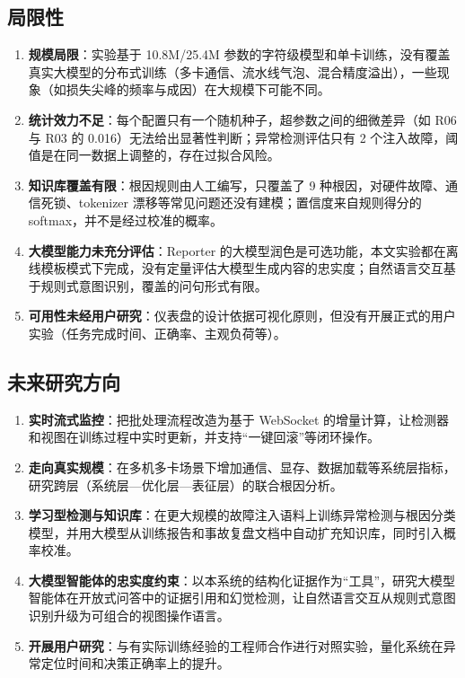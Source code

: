 \subsection{局限性}

\begin{enumerate}
\item \textbf{规模局限}：实验基于 10.8M/25.4M 参数的字符级模型和单卡训练，没有覆盖真实大模型的分布式训练（多卡通信、流水线气泡、混合精度溢出），一些现象（如损失尖峰的频率与成因）在大规模下可能不同。
\item \textbf{统计效力不足}：每个配置只有一个随机种子，超参数之间的细微差异（如 R06 与 R03 的 0.016）无法给出显著性判断；异常检测评估只有 2 个注入故障，阈值是在同一数据上调整的，存在过拟合风险。
\item \textbf{知识库覆盖有限}：根因规则由人工编写，只覆盖了 9 种根因，对硬件故障、通信死锁、tokenizer 漂移等常见问题还没有建模；置信度来自规则得分的 softmax，并不是经过校准的概率。
\item \textbf{大模型能力未充分评估}：Reporter 的大模型润色是可选功能，本文实验都在离线模板模式下完成，没有定量评估大模型生成内容的忠实度；自然语言交互基于规则式意图识别，覆盖的问句形式有限。
\item \textbf{可用性未经用户研究}：仪表盘的设计依据可视化原则，但没有开展正式的用户实验（任务完成时间、正确率、主观负荷等）。
\end{enumerate}

\subsection{未来研究方向}

\begin{enumerate}
\item \textbf{实时流式监控}：把批处理流程改造为基于 WebSocket 的增量计算，让检测器和视图在训练过程中实时更新，并支持“一键回滚”等闭环操作。
\item \textbf{走向真实规模}：在多机多卡场景下增加通信、显存、数据加载等系统层指标，研究跨层（系统层—优化层—表征层）的联合根因分析。
\item \textbf{学习型检测与知识库}：在更大规模的故障注入语料上训练异常检测与根因分类模型，并用大模型从训练报告和事故复盘文档中自动扩充知识库，同时引入概率校准。
\item \textbf{大模型智能体的忠实度约束}：以本系统的结构化证据作为“工具”，研究大模型智能体在开放式问答中的证据引用和幻觉检测，让自然语言交互从规则式意图识别升级为可组合的视图操作语言。
\item \textbf{开展用户研究}：与有实际训练经验的工程师合作进行对照实验，量化系统在异常定位时间和决策正确率上的提升。
\end{enumerate}


